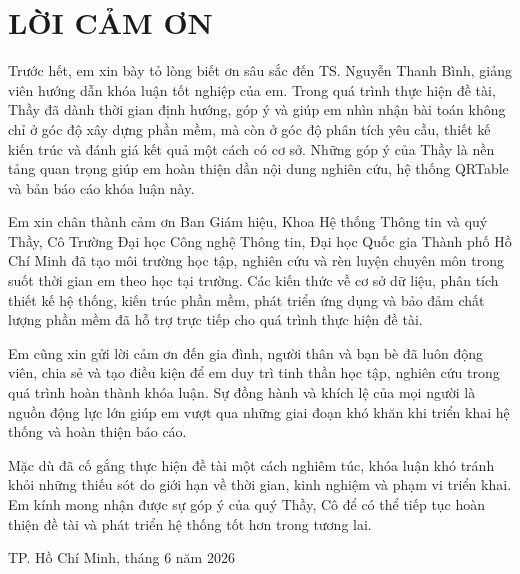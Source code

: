 \chapter*{LỜI CẢM ƠN}

Trước hết, em xin bày tỏ lòng biết ơn sâu sắc đến TS. Nguyễn Thanh Bình, giảng viên hướng dẫn khóa luận tốt nghiệp của em. Trong quá trình thực hiện đề tài, Thầy đã dành thời gian định hướng, góp ý và giúp em nhìn nhận bài toán không chỉ ở góc độ xây dựng phần mềm, mà còn ở góc độ phân tích yêu cầu, thiết kế kiến trúc và đánh giá kết quả một cách có cơ sở. Những góp ý của Thầy là nền tảng quan trọng giúp em hoàn thiện dần nội dung nghiên cứu, hệ thống QRTable và bản báo cáo khóa luận này.

Em xin chân thành cảm ơn Ban Giám hiệu, Khoa Hệ thống Thông tin và quý Thầy, Cô Trường Đại học Công nghệ Thông tin, Đại học Quốc gia Thành phố Hồ Chí Minh đã tạo môi trường học tập, nghiên cứu và rèn luyện chuyên môn trong suốt thời gian em theo học tại trường. Các kiến thức về cơ sở dữ liệu, phân tích thiết kế hệ thống, kiến trúc phần mềm, phát triển ứng dụng và bảo đảm chất lượng phần mềm đã hỗ trợ trực tiếp cho quá trình thực hiện đề tài.

Em cũng xin gửi lời cảm ơn đến gia đình, người thân và bạn bè đã luôn động viên, chia sẻ và tạo điều kiện để em duy trì tinh thần học tập, nghiên cứu trong quá trình hoàn thành khóa luận. Sự đồng hành và khích lệ của mọi người là nguồn động lực lớn giúp em vượt qua những giai đoạn khó khăn khi triển khai hệ thống và hoàn thiện báo cáo.

Mặc dù đã cố gắng thực hiện đề tài một cách nghiêm túc, khóa luận khó tránh khỏi những thiếu sót do giới hạn về thời gian, kinh nghiệm và phạm vi triển khai. Em kính mong nhận được sự góp ý của quý Thầy, Cô để có thể tiếp tục hoàn thiện đề tài và phát triển hệ thống tốt hơn trong tương lai.

\begin{flushright}
TP. Hồ Chí Minh, tháng 6 năm 2026\\
\thesisauthor
\end{flushright}

\cleardoublepage
